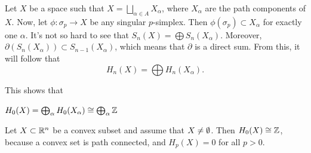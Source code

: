 Let $X$ be a space such that $X = \bigsqcup_{\alpha \in A} X_\alpha$, where $X_\alpha$ are the path components of $X$.
Now, let $\phi: \sigma_p \to  X$ be any singular $p$-simplex.
Then $\phi(\sigma_p) \subset X_\alpha$ for exactly one $\alpha$.
It's not so hard to see that $S_n(X) = \bigoplus S_n(X_\alpha)$.
Moreover,  $\partial(S_n(X_\alpha)) \subset S_{n-1}(X_\alpha)$,
which means that $\partial$ is a direct sum.
From this, it will follow that
\[
    H_n(X) = \bigoplus H_n(X_\alpha)
.\]

This shows that
\begin{prop}
    $H_0(X) = \bigoplus_\alpha H_0(X_\alpha) \cong \bigoplus_\alpha \mathbb{Z}$
\end{prop}

\begin{theorem}
    Let $X \subset \mathbb{R}^n$ be a convex subset and assume that $X \neq \emptyset$.
    Then $H_0(X) \cong \mathbb{Z}$, because a convex set is path connected,
    and $H_p(X) = 0$ for all $p > 0$.
\end{theorem}
